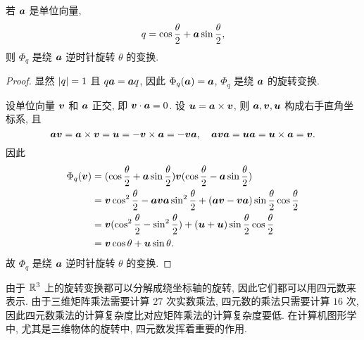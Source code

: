\begin{theorem}
  若 $\bfa$ 是单位向量,
  \[
    q=\cos\frac\theta2+\bfa\sin\frac\theta2,
  \]
  则 $\Phi_q$ 是绕 $\bfa$ 逆时针旋转 $\theta$ 的变换.
\end{theorem}

\begin{proof}
  显然 $\abs{q}=1$ 且 $q\bfa=\bfa q$, 因此 $\Phi_q(\bfa)=\bfa$, $\Phi_q$ 是绕 $\bfa$ 的旋转变换.

  设单位向量 $\bfv$ 和 $\bfa$ 正交, 即 $\bfv\cdot \bfa=0$.
  设 $\bfu=\bfa\times\bfv$, 则 $\bfa,\bfv,\bfu$ 构成右手直角坐标系, 且
  \[
    \bfa\bfv=\bfa\times\bfv=\bfu=-\bfv\times\bfa=-\bfv\bfa,\quad
    \bfa\bfv\bfa=\bfu\bfa=\bfu\times\bfa=\bfv.
  \]
  因此
  \begin{align*}
    \Phi_q(\bfv)&
    =(\cos\frac\theta2+\bfa\sin\frac\theta2)\bfv 
      (\cos\frac\theta2-\bfa\sin\frac\theta2)\\&
    =\bfv\cos^2\frac\theta2-\bfa\bfv\bfa\sin^2\frac\theta2
      +(\bfa\bfv-\bfv\bfa)\sin\frac\theta2\cos\frac\theta2\\&
    =\bfv(\cos^2\frac\theta2-\sin^2\frac\theta2)
      +(\bfu+\bfu)\sin\frac\theta2\cos\frac\theta2\\&
    =\bfv\cos\theta+\bfu\sin\theta.
  \end{align*}
  故 $\Phi_q$ 是绕 $\bfa$ 逆时针旋转 $\theta$ 的变换.
\end{proof}

由于 $\BR^3$ 上的旋转变换都可以分解成绕坐标轴的旋转, 因此它们都可以用四元数来表示.
由于三维矩阵乘法需要计算 $27$ 次实数乘法, 四元数的乘法只需要计算 $16$ 次, 因此四元数乘法的计算复杂度比对应矩阵乘法的计算复杂度要低.
在计算机图形学中, 尤其是三维物体的旋转中, 四元数发挥着重要的作用.


\newpage
{}

